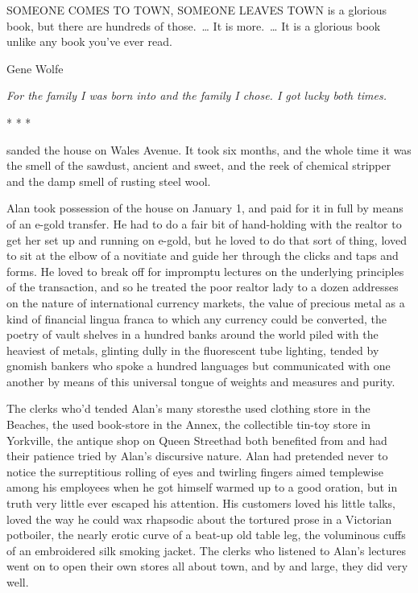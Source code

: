 \newpage
\noindent
SOMEONE COMES TO TOWN, SOMEONE LEAVES TOWN is a glorious book, but
there are hundreds of those.~\ldots{}  It is more.~\ldots{}  It is a glorious
book unlike any book you've ever read.

{\hfill \dash{}Gene Wolfe}

\bigskip

\noindent
\textit{For the family I was born into and the family I chose.  I got lucky
both times.}

\begin{center}
* * *
\end{center}

 sanded the house on Wales Avenue.  It took six months, and the
whole time it was the smell of the sawdust, ancient and sweet, and the
reek of chemical stripper and the damp smell of rusting steel wool.

Alan took possession of the house on January 1, and paid for it in
full by means of an e-gold transfer.  He had to do a fair bit of
hand-holding with the realtor to get her set up and running on e-gold,
but he loved to do that sort of thing, loved to sit at the elbow of a
novitiate and guide her through the clicks and taps and forms.  He
loved to break off for impromptu lectures on the underlying principles
of the transaction, and so he treated the poor realtor lady to a dozen
addresses on the nature of international currency markets, the value
of precious metal as a kind of financial lingua franca to which any
currency could be converted, the poetry of vault shelves in a hundred
banks around the world piled with the heaviest of metals, glinting
dully in the fluorescent tube lighting, tended by gnomish bankers who
spoke a hundred languages but communicated with one another by means
of this universal tongue of weights and measures and purity.

The clerks who'd tended Alan's many stores\dash{}the used clothing store
in the Beaches, the used book-store in the Annex, the collectible
tin-toy store in Yorkville, the antique shop on Queen Street\dash{}had
both benefited from and had their patience tried by Alan's discursive
nature.  Alan had pretended never to notice the surreptitious rolling
of eyes and twirling fingers aimed templewise among his employees when
he got himself warmed up to a good oration, but in truth very little
ever escaped his attention.  His customers loved his little talks,
loved the way he could wax rhapsodic about the tortured prose in a
Victorian potboiler, the nearly erotic curve of a beat-up old table
leg, the voluminous cuffs of an embroidered silk smoking jacket.  The
clerks who listened to Alan's lectures went on to open their own
stores all about town, and by and large, they did very well.

